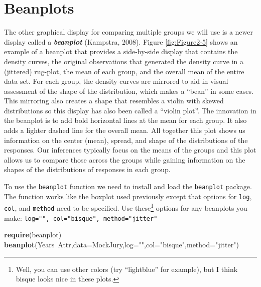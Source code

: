 \documentclass[]{book}
\newenvironment{Shaded}{\begin{snugshade}}{\end{snugshade}}
\newcommand{\KeywordTok}[1]{\textcolor[rgb]{0.13,0.29,0.53}{\textbf{{#1}}}}
\newcommand{\DataTypeTok}[1]{\textcolor[rgb]{0.13,0.29,0.53}{{#1}}}
\newcommand{\StringTok}[1]{\textcolor[rgb]{0.31,0.60,0.02}{{#1}}}
\newcommand{\NormalTok}[1]{{#1}}
\let\rmarkdownfootnote\footnote%
\def\footnote{\protect\rmarkdownfootnote}
\begin{document}
\section{Beanplots}\label{section2-2}

The other graphical display for comparing multiple groups we will use is
a newer display called a \textbf{\emph{beanplot}} (Kampstra, 2008).
Figure \ref{fig:Figure2-5} shows an example of a beanplot that provides
a side-by-side display that contains the density curves, the original
observations that generated the density curve in a (jittered) rug-plot,
the mean of each group, and the overall mean of the entire data set. For
each group, the density curves are mirrored to aid in visual assessment
of the shape of the distribution, which makes a ``bean'' in some cases.
This mirroring also creates a shape that resembles a violin with skewed
distributions so this display has also been called a ``violin plot''.
The innovation in the beanplot is to add bold horizontal lines at the
mean for each group. It also adds a lighter dashed line for the overall
mean. All together this plot shows us information on the center (mean),
spread, and shape of the distributions of the responses. Our inferences
typically focus on the means of the groups and this plot allows us to
compare those across the groups while gaining information on the shapes
of the distributions of responses in each group.

To use the \texttt{beanplot} function we need to install and load the
\texttt{beanplot} package. The function works like the boxplot used
previously except that options for \texttt{log}, \texttt{col}, and
\texttt{method} need to be specified. Use these\footnote{Well, you can
  use other colors (try ``lightblue'' for example), but I think bisque
  looks nice in these plots.} options for any beanplots you make:
\texttt{log="",\ col="bisque",\ method="jitter"}




\begin{Shaded}
\begin{Highlighting}[]
\KeywordTok{require}\NormalTok{(beanplot)}
\KeywordTok{beanplot}\NormalTok{(Years~Attr,}\DataTypeTok{data=}\NormalTok{MockJury,}\DataTypeTok{log=}\StringTok{""}\NormalTok{,}\DataTypeTok{col=}\StringTok{"bisque"}\NormalTok{,}\DataTypeTok{method=}\StringTok{"jitter"}\NormalTok{)}
\end{Highlighting}
\end{Shaded}
\end{document}
